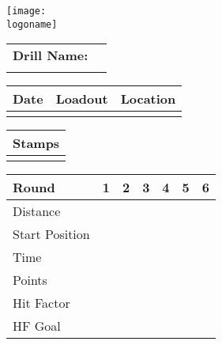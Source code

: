 \documentclass[../Cover.tex]{subfiles}
\begin{document}
	\begin{minipage}[t][0.15\textheight][t]{0.1\textwidth} 
		\texttt{[image: \\logoname]}
	\end{minipage}
	\hfill
	\begin{minipage}[t][0.15\textheight][t]{0.8\textwidth}
		\begin{tabular}{ p{} l  }
			\\		
			\textbf{Drill Name:} \\
			\\[0.03\textheight]
			\hline
		\end{tabular}
		\quad
		\small \begin{tabular}{ | p{} | p{} | p{} |}
			\hline
			\rowcolor[HTML]{C0C0C0}Date & Loadout & Location\\ 
			\hline
			&  &  \\ 
			\hline
		\end{tabular}
	\end{minipage}
	
	\begin{tabular}{p{}|}
		Stamps \\
		\hline
		\\[0.65\textheight]
	\end{tabular}
	\quad
	\begin{tabular}{ | p{} | p{} | p{} | p{} | p{} | p{} | p{} |}
		\hline
		\rowcolor[HTML]{C0C0C0}Round & 1 & 2 & 3 & 4 & 5 & 6 \\
		\hline
		\cellcolor[HTML]{C0C0C0}\tiny Distance & & & & & & \\[0.05\textheight]
		\hline
		\cellcolor[HTML]{C0C0C0}\tiny Start Position & & & & & & \\[0.05\textheight]
		\hline
		\cellcolor[HTML]{C0C0C0}\tiny Time & & & & & & \\[0.05\textheight]
		\hline
		\cellcolor[HTML]{C0C0C0}\tiny Points & & & & & & \\[0.05\textheight]
		\hline
		\cellcolor[HTML]{C0C0C0}\tiny Hit Factor & & & & & & \\[0.05\textheight]
		\hline
		\cellcolor[HTML]{C0C0C0}\tiny HF Goal & & & & & & \\[0.05\textheight]
		\hline
	\end{tabular}
\end{document}
